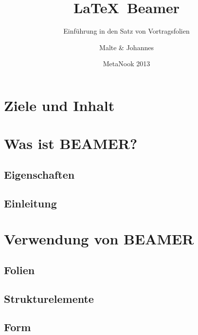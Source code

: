 \title{\LaTeX\ Beamer}
\subtitle{Einführung in den Satz von Vortragsfolien}
\author{Malte \& Johannes}
\date{MetaNook 2013}


  \section*{Ziele und Inhalt}

  \frame{}

  \section{Was ist BEAMER?}

  \frame{}

  \subsection{Eigenschaften}

  \frame{}\frame{}\frame{}\frame{}

  \subsection{Einleitung}

  \frame{}\frame{}\frame{}

  \section{Verwendung von BEAMER}

  \frame{}\frame{}\frame{}

  \subsection{Folien}

  \frame{}\frame{}\frame{}\frame{}\frame{}

  \subsection{Strukturelemente}

  \frame{}\frame{}\frame{}

  \subsection{Form}

  \frame{}\frame{}

